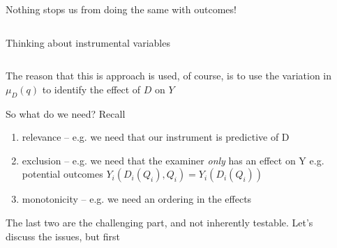 \documentclass[notes,11pt, aspectratio=169]{beamer}
\newenvironment{wideitemize}{\itemize\addtolength{\itemsep}{10pt}}{\enditemize}
\begin{document}
\begin{frame}{Nothing stops us from doing the same with outcomes!}
\begin{columns}[onlytextwidth, T]
\begin{column}{.5\textwidth}
      \end{column}%
    \end{columns}
\end{frame}

\begin{frame}{Thinking about instrumental variables}
  \begin{columns}[onlytextwidth, T] %
    \begin{column}{.7\textwidth}
      \begin{wideitemize}
      \item The reason that this is approach is used, of course, is to
        use the variation in $\mu_{D}(q)$ to identify the effect of
        $D$ on $Y$
      \item   So what do we need? Recall
        \begin{enumerate}
          \item  relevance -- e.g. we need that our instrument is predictive of D
          \item exclusion -- e.g. we need that the examiner
            \emph{only} has an effect on Y e.g. potential outcomes
            $Y_{i}(D_{i}(Q_{i}), Q_{i}) = Y_{i}(D_{i}(Q_{i}))$
          \item monotonicity -- e.g. we need an ordering in the effects
          \end{enumerate}
        \item The last two are the challenging part, and not
          inherently testable. Let's discuss the issues, but first
      \end{wideitemize}
    \end{column}%
    \hfill%
    \begin{column}{.5\textwidth}
    \end{column}%
  \end{columns}
\end{frame}
\end{document}
